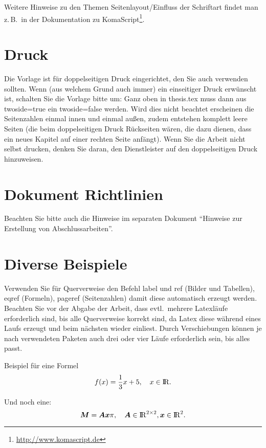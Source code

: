 Weitere Hinweise zu den Themen Seitenlayout/Einfluss der Schriftart findet man z.\,B.\ in der Dokumentation zu KomaScript\footnote{\url{http://www.komascript.de}}.


\section{Druck}
Die Vorlage ist für doppelseitigen Druck eingerichtet, den Sie auch verwenden sollten.
Wenn (aus welchem Grund auch immer) ein einseitiger Druck erwünscht ist, schalten Sie die Vorlage bitte um: Ganz oben in thesis.tex muss dann aus twoside=true ein twoside=false werden.
Wird dies  nicht beachtet erscheinen die Seitenzahlen einmal innen und einmal außen, zudem entstehen komplett leere Seiten (die beim doppelseitigen Druck Rückseiten wären, die dazu dienen, dass ein neues Kapitel auf einer rechten Seite anfängt).
Wenn Sie die Arbeit nicht selbst drucken, denken Sie daran, den Dienstleister auf den doppelseitigen Druck hinzuweisen.



\section{Dokument Richtlinien}
Beachten Sie bitte auch die Hinweise im separaten Dokument "`Hinweise zur Erstellung von Abschlussarbeiten"'.

\section{Diverse Beispiele}

Verwenden Sie für Querverweise den Befehl label und  ref (Bilder und Tabellen), eqref (Formeln), pageref (Seitenzahlen) damit diese automatisch erzeugt werden.
Beachten Sie vor der Abgabe der Arbeit, dass evtl.\ mehrere Latexläufe erforderlich sind, bis alle Querverweise korrekt sind, da Latex diese während eines Laufs erzeugt und beim nächsten wieder einliest.
Durch Verschiebungen können je nach verwendeten Paketen auch drei oder vier Läufe erforderlich sein, bis alles passt.



Beispiel für eine Formel
\begin{equation}
\label{eq:cvp:test}
f(x) = \frac{1}{3} x + 5, \quad x \in \mathord{\mathrm{I\!R}}.
\end{equation}

Und noch eine:
\begin{equation}
\label{eq:cvp:matvec}
\bm{M}  = \bm{Ax} \pi, \quad \bm{A} \in \mathord{\mathrm{I\!R}}^{2 \times 2}, \bm{x} \in \mathord{\mathrm{I\!R}}^2.
\end{equation}


